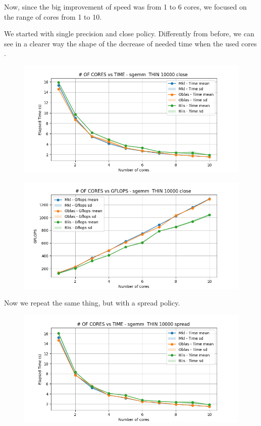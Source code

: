 \documentclass[12pt, titlepage]{report}
\begin{document}
Now, since the big improvement of speed was from 1 to 6 cores, we focused on the range of cores from 1 to 10.



We started with single precision and close policy. Differently from before, we can see in a clearer way the shape of the decrease of needed time when the used cores 
.   
\begin{figure}[H]
    \centering
    \includegraphics[width=\textwidth]{THIN scalability deep/sgemm__THIN_10000_close_time.png}
\end{figure}

\begin{figure}[H]
    \centering
    \includegraphics[width=\textwidth]{THIN scalability deep/sgemm__THIN_10000_close_gflops.png}
\end{figure}

Now we repeat the same thing, but with a spread policy.
\begin{figure}[H]
    \centering
    \includegraphics[width=\textwidth]{THIN scalability deep/sgemm__THIN_10000_spread_time.png}
\end{figure}
\end{document}
